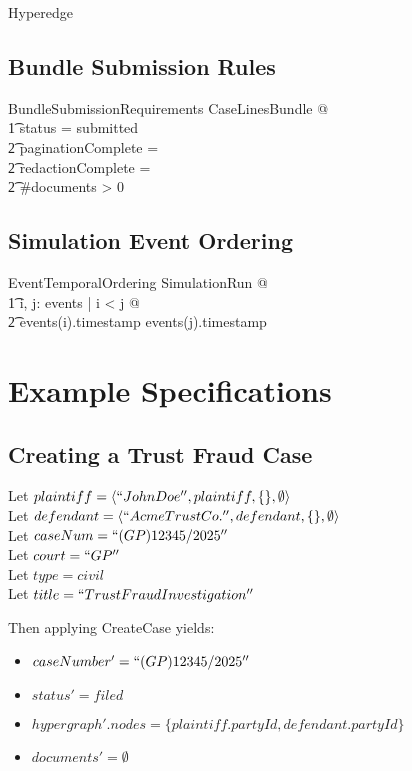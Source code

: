 \documentclass{article}
\begin{document}
\begin{class}{Hyperedge}
\subsection{Bundle Submission Rules}

\begin{theorem}{BundleSubmissionRequirements}
\forall CaseLinesBundle @ \\
\t1 status = submitted \implies \\
\t2 paginationComplete = \true \land \\
\t2 redactionComplete = \true \land \\
\t2 \#documents > 0
\end{theorem}

\subsection{Simulation Event Ordering}

\begin{theorem}{EventTemporalOrdering}
\forall SimulationRun @ \\
\t1 \forall i, j: \dom events | i < j @ \\
\t2 events(i).timestamp \leq events(j).timestamp
\end{theorem}

\newpage

\section{Example Specifications}

\subsection{Creating a Trust Fraud Case}

\begin{example}
Let $plaintiff = \langle``John Doe'', plaintiff, \{\}, \emptyset \rangle$ \\
Let $defendant = \langle``Acme Trust Co.'', defendant, \{\}, \emptyset \rangle$ \\
Let $caseNum = ``(GP) 12345/2025''$ \\
Let $court = ``GP''$ \\
Let $type = civil$ \\
Let $title = ``Trust Fraud Investigation''$

Then applying CreateCase yields:
\begin{itemize}
    \item $caseNumber' = ``(GP) 12345/2025''$
    \item $status' = filed$
    \item $hypergraph'.nodes = \{plaintiff.partyId, defendant.partyId\}$
    \item $documents' = \emptyset$
\end{itemize}
\end{example}


\end{class}
\end{document}
